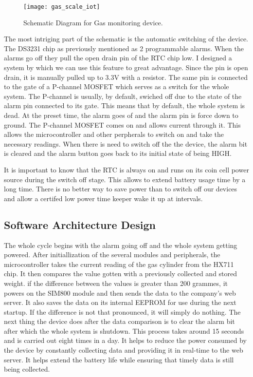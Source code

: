 \begin{figure}
    \centering
    \texttt{[image: gas\_scale\_iot]}
	\caption{Schematic Diagram for Gas monitoring device.}
    \label{fig:gas_scale_iot}
\end{figure}


The most intriging part of the schematic is the automatic switching of the device. The DS3231 chip as previously mentioned as 2 programmable alarms. When the alarms go off they pull the open drain pin of the RTC chip low. I designed a system by which we can use this feature to great advantage. Since the pin is open drain, it is manually pulled up to 3.3V with a resistor. The same pin is connected to the gate of a P-channel MOSFET which serves as a switch for the whole system. The P-channel is usually, by default, swiched off due to the state of the alarm pin connected to its gate. This means that by default, the whole system is dead. At the preset time, the alarm goes of and the alarm pin is force down to ground. The P-channel MOSFET comes on and allows current through it. This allows the microcontroller and other perpherals to switch on and take the necessary readings. When there is need to switch off the the device, the alarm bit is cleared and the alarm button goes back to its initial state of being HIGH.



It is important to know that the RTC is always on and runs on its coin cell power source during the switch off stage. This allows to extend battery usage time by a long time. There is no better way to save power than to switch off our devices and allow a certifed low power time keeper wake it up at intervals. 

\subsection{Software Architecture Design}
The whole cycle begins with the alarm going off and the whole system getting powered. After initiallization of the several modules and peripherals, the microcontroller takes the current reading of the gas cylinder from the HX711 chip. It then compares the value gotten with a previously collected and stored weight. if the difference between the values is greater than 200 grammes, it powers on the SIM800 module and then sends the data to the company's web server. It also saves the data on its internal EEPROM for use during the next startup. If the difference is not that pronounced, it will simply do nothing. The next thing the device does after the data comparison is to clear the alarm bit after which the whole system is shutdown. This process takes around 15 seconds and is carried out eight times in a day. It helps to reduce the power consumed by the device by constantly collecting data and providing it in real-time to the web server. It helps extend the battery life while ensuring that timely data is still being collected.


